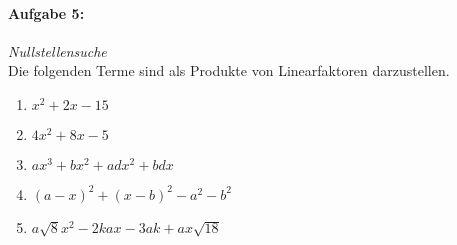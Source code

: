 \paragraph{Aufgabe 5: } \emph{Nullstellensuche}\\[0.2cm]
Die folgenden Terme sind als Produkte von Linearfaktoren darzustellen.
\begin{enumerate}[label=(\alph*)]
    \item $x^2+2x-15$
    \item $4x^2+8x-5$
    \item $ax^3+bx^2+adx^2+bdx$
    \item $(a-x)^2+(x-b)^2-a^2-b^2$
    \item $a\sqrt{8}x^2-2kax-3ak+ax\sqrt{18}$
\end{enumerate}